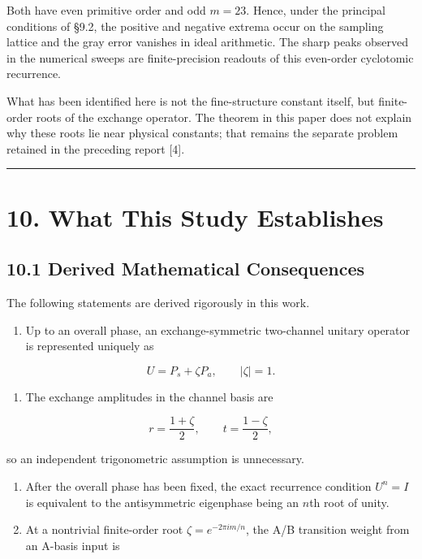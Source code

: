 \documentclass[
  a4paper,
  10pt]{article}
\providecommand{\tightlist}{%
  \setlength{\itemsep}{0pt}\setlength{\parskip}{0pt}}
\begin{document}
Both have even primitive order and odd \(m=23\). Hence, under the
principal conditions of §9.2, the positive and negative extrema occur on
the sampling lattice and the gray error vanishes in ideal arithmetic.
The sharp peaks observed in the numerical sweeps are finite-precision
readouts of this even-order cyclotomic recurrence.

What has been identified here is not the fine-structure constant itself,
but finite-order roots of the exchange operator. The theorem in this
paper does not explain why these roots lie near physical constants; that
remains the separate problem retained in the preceding report {[}4{]}.

\begin{center}\rule{0.5\linewidth}{0.5pt}\end{center}

\section{10. What This Study
Establishes}\label{10-what-this-study-establishes}

\subsection{10.1 Derived Mathematical
Consequences}\label{101-derived-mathematical-consequences}

The following statements are derived rigorously in this work.

\begin{enumerate}
\def\labelenumi{\arabic{enumi}.}
\tightlist
\item
  Up to an overall phase, an exchange-symmetric two-channel unitary
  operator is represented uniquely as
\end{enumerate}

\[
U=P_s+\zeta P_a,
\qquad |\zeta|=1.
\]

\begin{enumerate}
\def\labelenumi{\arabic{enumi}.}
\setcounter{enumi}{1}
\tightlist
\item
  The exchange amplitudes in the channel basis are
\end{enumerate}

\[
r=\frac{1+\zeta}{2},
\qquad
t=\frac{1-\zeta}{2},
\]

so an independent trigonometric assumption is unnecessary.

\begin{enumerate}
\def\labelenumi{\arabic{enumi}.}
\setcounter{enumi}{2}
\item
  After the overall phase has been fixed, the exact recurrence condition
  \(U^n=I\) is equivalent to the antisymmetric eigenphase being an
  \(n\)th root of unity.
\item
  At a nontrivial finite-order root \(\zeta=e^{-2\pi im/n}\), the A/B
  transition weight from an A-basis input is
\end{enumerate}
\end{document}
